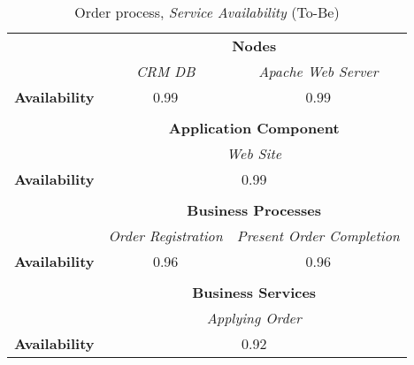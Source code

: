 \begin{table}[H]
	\centering
	\begin{tabular}{|c|c|p{2cm}|p{2.5cm}|p{2.5cm}|p{2.5cm}|}
		\cline{3-6}

		\multicolumn{2}{c}{} & \multicolumn{4}{|c|}{\textbf{Nodes}} \\ \cline{3-6}
		\multicolumn{2}{c|}{} & \multicolumn{2}{c|}{\textsl{CRM DB}} & \multicolumn{2}{c|}{\textsl{Apache Web Server}} \\
		\hline
		\multicolumn{2}{|c|}{\textbf{Availability}}  & \multicolumn{2}{c|}{0.99} & \multicolumn{2}{c|}{0.99} \\ \hline
		
		\multicolumn{6}{c}{} \\ \cline{3-6}
		\multicolumn{2}{c}{} & \multicolumn{4}{|c|}{\textbf{Application Component}} \\ \cline{3-6}
		\multicolumn{2}{c|}{} & \multicolumn{4}{c|}{\textsl{Web Site}}  \\
		\hline
		\multicolumn{2}{|c|}{\textbf{Availability}} & \multicolumn{4}{c|}{0.99}  \\ \hline
		
		\multicolumn{6}{c}{} \\ \cline{3-6}
		\multicolumn{2}{c}{} & \multicolumn{4}{|c|}{\textbf{Business Processes}} \\ \cline{3-6}
		\multicolumn{2}{c|}{} & \multicolumn{2}{c|}{\textsl{Order Registration}} & \multicolumn{2}{c|}{\textsl{Present Order Completion}} \\
		\hline
		\multicolumn{2}{|c|}{\textbf{Availability}} & \multicolumn{2}{c|}{0.96} & \multicolumn{2}{c|}{0.96} \\ \hline

		\multicolumn{6}{c}{} \\ \cline{3-6}
		\multicolumn{2}{c}{} & \multicolumn{4}{|c|}{\textbf{Business Services}} \\ \cline{3-6}
		\multicolumn{2}{c|}{} &  \multicolumn{4}{c|}{\textsl{Applying Order}}  \\
		\hline
		\multicolumn{2}{|c|}{\textbf{Availability}}  & \multicolumn{4}{c|}{0.92}\\ \hline
	\end{tabular}
\caption{Order process, \textsl{Service Availability} (To-Be)} 
\label{tab:order_as_is}
\end{table}